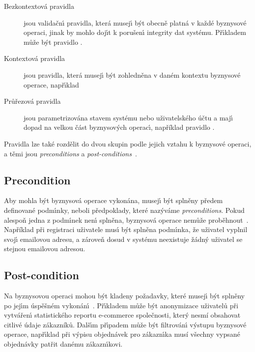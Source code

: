 \begin{description}
    \item [Bezkontextová pravidla] jsou validačn\'{\i} pravidla, která musej\'{\i} b\'yt obecně platná
    v každé byznysové operaci, jinak by mohlo doj\'{\i}t k porušen\'{\i} integrity dat systému.
    Př\'{\i}kladem může b\'yt pravidlo .
    \item [Kontextová pravidla] jsou pravidla, která musej\'{\i} b\'yt zohledněna v daném kontextu
    byznysové operace, např\'{\i}klad 
    \item [Průřezová pravidla] jsou parametrizována stavem systému nebo uživatelského účtu a maj\'{\i}
    dopad na velkou část byznysov\'ych operac\'{\i}, například pravidlo .
\end{description}

Pravidla lze také rozdělit do dvou skupin podle jejich vztahu k byznysové operaci, a těmi jsou
\textit{preconditions} a \textit{post-conditions}~\cite{cemus2015automated, morgan2002business}.

\subsection{Precondition}

Aby mohla b\'yt byznysová operace vykonána, musej\'{\i}
b\'yt splněny předem definované podm\'{\i}nky, neboli předpoklady,
které naz\'yváme \textit{preconditions}. Pokud alespoň jedna z podm\'{\i}nek
nen\'{\i} splněna, byznysová operace nemůže proběhnout~\cite{larman2001patterns}.
Například při registraci uživatele mus\'{\i} b\'yt splněna podm\'{\i}nka,
že uživatel vyplnil svoj\'{\i} emailovou adresu, a zároveň
dosud v systému neexistuje žádn\'y uživatel se stejnou emailovou adresou.

\subsection{Post-condition}

Na byznysovou operaci mohou b\'yt kladeny požadavky, které
musej\'{\i} b\'yt splněny po jej\'{\i}m úspěšném vykonán\'{\i}~\cite{cemus2015automated}.
Př\'{\i}kladem může b\'yt anonymizace uživatelů při vytvářen\'{\i} statistického
reportu e-commerce společnosti, který nesmí obsahovat citlivé údaje
zákazníků. Dalš\'{\i}m př\'{\i}padem může b\'yt filtrován\'{\i}
v\'ystupu byznysové operace, např\'{\i}klad při v\'ypisu objednávek pro zákazn\'{\i}ka
musí všechny vypsané objednávky patřit danému zákazn\'{\i}kovi.

